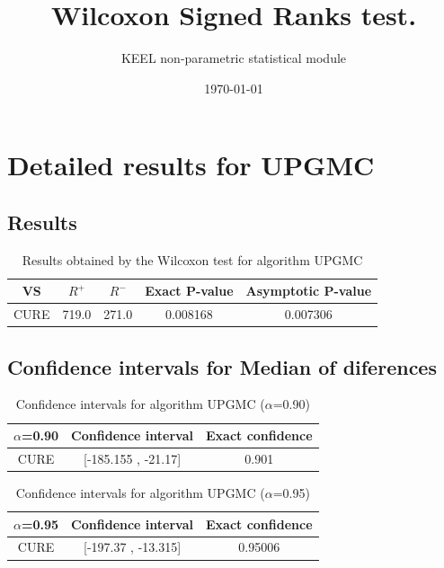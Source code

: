 \documentclass[a4paper,10pt]{article}
\title{Wilcoxon Signed Ranks test.}
\date{\today}
\author{KEEL non-parametric statistical module}
\begin{document}
\pagestyle{empty}
\maketitle
\thispagestyle{empty}



\section{Detailed results for UPGMC}


\subsection{Results}

\begin{table}[!htp]
\centering\small
\begin{tabular}{
|c|c|c|c|c|}
\hline
 VS & $R^{+}$ & $R^{-}$ & Exact P-value & Asymptotic P-value \\ \hline 
CURE & 719.0 & 271.0 & 0.008168 & 0.007306\\ \hline 

\end{tabular}
\caption{Results obtained by the Wilcoxon test for algorithm UPGMC}
\end{table}

\subsection{Confidence intervals for Median of diferences}

\begin{table}[!htp]
\centering\small
\begin{tabular}{
|c|c|c|}
\hline
 $\alpha$=0.90 & Confidence interval & Exact confidence \\ \hline 
CURE & [-185.155 , -21.17] & 0.901\\ \hline 

\end{tabular}
\caption{Confidence intervals for algorithm UPGMC ($\alpha$=0.90)}
\end{table}
\begin{table}[!htp]
\centering\small
\begin{tabular}{
|c|c|c|}
\hline
 $\alpha$=0.95 & Confidence interval & Exact confidence \\ \hline 
CURE & [-197.37 , -13.315] & 0.95006\\ \hline 

\end{tabular}
\caption{Confidence intervals for algorithm UPGMC ($\alpha$=0.95)}
\end{table}
\end{document}
